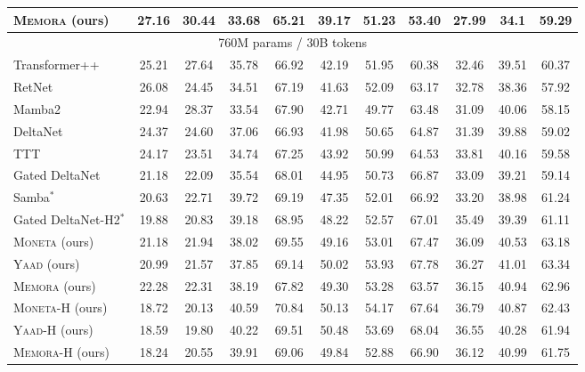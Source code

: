 \documentclass{article}
\newcommand{\ymodel}[0]{\textsc{Yaad}}
\newcommand{\mmodel}[0]{\textsc{Moneta}}
\newcommand{\xmodel}[0]{\textsc{Memora}}
\theoremstyle{plain}
\theoremstyle{definition}
\theoremstyle{remark}
\begin{document}
\begin{table}[t!]
{\begin{tabular}{l|c c|c c c c c c c c }
\xmodel{} (ours) & 27.16 &  30.44 &  33.68  & \cellcolor{myblue} 65.21  & 39.17  & 51.23  & 53.40  & 27.99 & 34.1& 59.29  \\
\midrule
\multicolumn{11}{c}{760M params / 30B tokens} \\
\midrule
 Transformer++ & 25.21 & 27.64 & 35.78 & 66.92 & 42.19 &	51.95 & 60.38	& 32.46 &  39.51  & 60.37  \\
 RetNet & 26.08 & 24.45 & 34.51 & 67.19 & 41.63 &	52.09 & 63.17	& 32.78 &  38.36  & 57.92  \\
 Mamba2 & 22.94 & 28.37 & 33.54 & 67.90 & 42.71 &	49.77 & {63.48}	& 31.09 &  40.06  & 58.15   \\
 DeltaNet & 24.37 & 24.60 & 37.06 & 66.93 & 41.98 &	50.65 & 64.87	& 31.39 &  39.88  & 59.02   \\
 TTT & 24.17 & 23.51 & 34.74 & 67.25 & 43.92 & 50.99 & 64.53 & 33.81 & {40.16} & 59.58  \\
 Gated DeltaNet & {21.18} & {22.09} & {35.54} & {68.01} & {44.95} & {50.73} & {66.87}	& {33.09} &  {39.21}  & 59.14  \\
 Samba$^{*}$ & 20.63 & 22.71 & 39.72 & 69.19 & 47.35 &	52.01 & 66.92	& 33.20 &  38.98  & 61.24  \\
  Gated DeltaNet-H2$^*$ & {19.88} & 20.83 & {39.18} & 68.95 & {48.22} &	{52.57} & 67.01	& {35.49} &  {39.39}  & 61.11  \\
  \midrule
\mmodel{} (ours) & 21.18 & 21.94 & 38.02 & \cellcolor{myblue} 69.55  & 49.16 & 53.01 & 67.47 & 36.09 & 40.53 & 63.18  \\
\ymodel{} (ours) &  
20.99 & 21.57 & 37.85 & 69.14  & \cellcolor{myblue} 50.02 & \cellcolor{myblue} 53.93 & \cellcolor{myblue} 67.78 & \cellcolor{myblue} 36.27 & \cellcolor{myblue} 41.01 & \cellcolor{myblue} 63.34 \\
\xmodel{} (ours) &  22.28 & 22.31 & 38.19 & 67.82  & 49.30 & 53.28 & 63.57 & 36.15 & 40.94 & 62.96 \\
  \midrule
\mmodel-H (ours) &  18.72 & 20.13  & \cellcolor{mygreen} 40.59   & \cellcolor{mygreen} 70.84 & 50.13 & \cellcolor{mygreen} 54.17  & 67.64  & \cellcolor{mygreen}36.79 & 40.87 & \cellcolor{mygreen}62.43 \\
\ymodel-H (ours) & 18.59 & \cellcolor{mygreen} 19.80  & 40.22   &  69.51 & \cellcolor{mygreen} 50.48 & 53.69  & \cellcolor{mygreen}68.04  & 36.55 & 40.28 & 61.94 \\
\xmodel-H (ours) & \cellcolor{mygreen} 18.24 & 20.55  & 39.91   &  69.06 & 49.84 & 52.88  & 66.90  & 36.12 & \cellcolor{mygreen} 40.99 & 61.75 \\

\end{tabular}}
\end{table}
\end{document}
